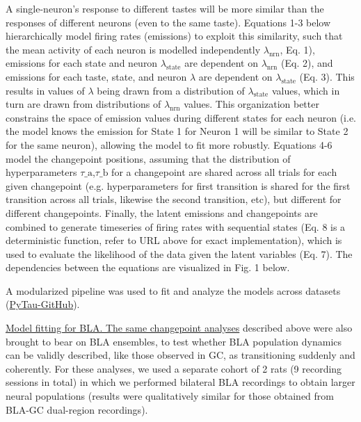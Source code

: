\begin{refsection}
\noindent A single-neuron’s response to different tastes will be more similar than the responses of different neurons (even to the same taste). Equations 1-3 below hierarchically model firing rates (emissions) to exploit this similarity, such that the mean activity of each neuron is modelled independently \(\lambda_\text{nrn}\), Eq. 1), emissions for each state and neuron \(\lambda_\text{state}\) are dependent on \(\lambda_\text{nrn}\) (Eq. 2), and emissions for each taste, state, and neuron \(\lambda\) are dependent on \(\lambda_\text{state}\) (Eq. 3). This results in values of \(\lambda\) being drawn from a distribution of \(\lambda_\text{state}\) values, which in turn are drawn from distributions of \(\lambda_\text{nrn}\) values. This organization better constrains the space of emission values during different states for each neuron (i.e. the model knows the emission for State 1 for Neuron 1 will be similar to State 2 for the same neuron), allowing the model to fit more robustly. Equations 4-6 model the changepoint positions, assuming that the distribution of hyperparameters \(\tau\text{_a}\),\(\tau\text{_b}\) for a changepoint are shared across all trials for each given changepoint (e.g. hyperparameters for first transition is shared for the first transition across all trials, likewise the second transition, etc), but different for different changepoints. Finally, the latent emissions and changepoints are combined to generate timeseries of firing rates with sequential states (Eq. 8 is a deterministic function, refer to URL above for exact implementation), which is used to evaluate the likelihood of the data given the latent variables (Eq. 7). The dependencies between the equations are visualized in Fig. 1 below.
 
\noindent A modularized pipeline was used to fit and analyze the models across datasets (\href{https://github.com/abuzarmahmood/pytau/tree/development/pytau}{PyTau-GitHub}).

\noindent\underline{Model fitting for BLA. The same changepoint analyses} described above were also brought to bear on BLA ensembles, to test whether BLA population dynamics can be validly described, like those observed in GC, as transitioning suddenly and coherently. For these analyses, we used a separate cohort of 2 rats (9 recording sessions in total) in which we performed bilateral BLA recordings to obtain larger neural populations (results were qualitatively similar for those obtained from BLA-GC dual-region recordings). 


\end{refsection}

